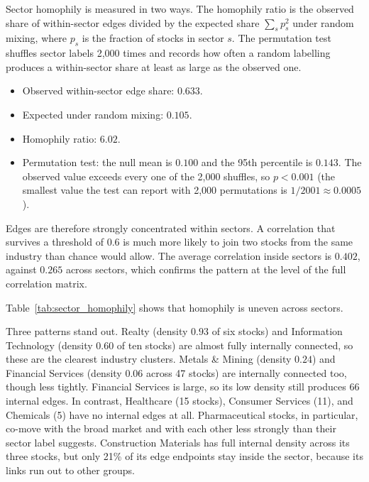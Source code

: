 \documentclass[12pt,a4paper]{report}
\begin{document}
Sector homophily is measured in two ways. The homophily ratio is the observed share of within-sector edges divided by the expected share $\sum_s p_s^2$ under random mixing, where $p_s$ is the fraction of stocks in sector $s$. The permutation test shuffles sector labels 2,000 times and records how often a random labelling produces a within-sector share at least as large as the observed one.

\begin{itemize}
  \item Observed within-sector edge share: $0.633$.
  \item Expected under random mixing: $0.105$.
  \item Homophily ratio: $6.02$.
  \item Permutation test: the null mean is $0.100$ and the 95th percentile is $0.143$. The observed value exceeds every one of the 2,000 shuffles, so $p<0.001$ (the smallest value the test can report with 2,000 permutations is $1/2001\approx0.0005$).
\end{itemize}

Edges are therefore strongly concentrated within sectors. A correlation that survives a threshold of 0.6 is much more likely to join two stocks from the same industry than chance would allow. The average correlation inside sectors is $0.402$, against $0.265$ across sectors, which confirms the pattern at the level of the full correlation matrix.

Table~\ref{tab:sector_homophily} shows that homophily is uneven across sectors.



Three patterns stand out. Realty (density $0.93$ of six stocks) and Information Technology (density $0.60$ of ten stocks) are almost fully internally connected, so these are the clearest industry clusters. Metals \& Mining (density $0.24$) and Financial Services (density $0.06$ across 47 stocks) are internally connected too, though less tightly. Financial Services is large, so its low density still produces 66 internal edges. In contrast, Healthcare (15 stocks), Consumer Services (11), and Chemicals (5) have no internal edges at all. Pharmaceutical stocks, in particular, co-move with the broad market and with each other less strongly than their sector label suggests. Construction Materials has full internal density across its three stocks, but only 21\% of its edge endpoints stay inside the sector, because its links run out to other groups.
\end{document}
